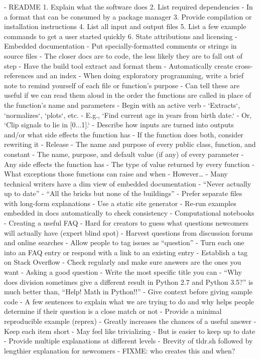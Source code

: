 \documentclass[10pt,letterpaper]{article}
\begin{document}
- README
  1. Explain what the software does
  2. List required dependencies
     - In a format that can be consumed by a package manager
  3. Provide compilation or installation instructions
  4. List all input and output files
  5. List a few example commands to get a user started quickly
  6. State attributions and licensing
- Embedded documentation
  - Put specially-formatted comments or strings in source files
    - The closer docs are to code, the less likely they are to fall out of step
  - Have the build tool extract and format them
    - Automatically create cross-references and an index
- When doing exploratory programming, write a brief note to remind yourself of each file or function's purpose
  - Can tell these are useful if we can read them aloud in the order the functions are called in place of the function's name and parameters
  - Begin with an active verb
    - `Extracts`, `normalizes`, `plots`, etc.
    - E.g., `Find current age in years from birth date.`
    - Or, `Clip signals to lie in [0...1].`
  - Describe how inputs are turned into outputs and/or what side effects the function has
    - If the function does both, consider rewriting it
- Release
  - The name and purpose of every public class, function, and constant
  - The name, purpose, and default value (if any) of every parameter
  - Any side effects the function has
  - The type of value returned by every function
  - What exceptions those functions can raise and when
- However{\ldots}
  - Many technical writers have a dim view of embedded documentation
    - ``Never actually up to date''
    - ``All the bricks but none of the buildings''
  - Prefer separate files with long-form explanations
    - Use a static site generator
  - Re-run examples embedded in docs automatically to check consistency
    - Computational notebooks
- Creating a useful FAQ
  - Hard for creators to guess what questions newcomers will actually have (expert blind spot)
  - Harvest questions from discussion forums and online searches
    - Allow people to tag issues as ``question''
    - Turn each one into an FAQ entry or respond with a link to an existing entry
  - Establish a tag on Stack Overflow
    - Check regularly and make sure answers are the ones you want
- Asking a good question
  - Write the most specific title you can
    - ``Why does division sometimes give a different result in Python 2.7 and Python 3.5?'' is much better than, ``Help! Math in Python!!''
  - Give context before giving sample code
    - A few sentences to explain what we are trying to do and why helps people determine if their question is a close match or not
  - Provide a minimal reproducible example (reprex)
    - Greatly increases the chances of a useful answer
  - Keep each item short
    - May feel like trivializing
    - But is easier to keep up to date
  - Provide multiple explanations at different levels
    - Brevity of tldr.sh followed by lengthier explanation for newcomers
- FIXME: who creates this and when?
\end{document}
